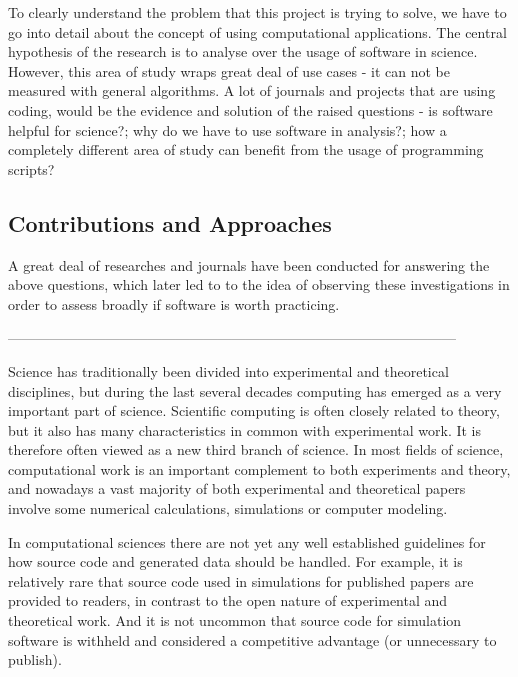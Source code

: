 
To clearly understand the problem that this project is trying to solve, we have to go into detail about the concept of using computational applications. The central hypothesis of the research is to analyse over the usage of software in science. However, this area of study wraps great deal of use cases - it can not be measured with general algorithms. A lot of journals and projects that are using coding, would be the evidence and solution of the raised questions - is software helpful for science?; why do we have to use software in analysis?; how a completely different area of study can benefit from the usage of programming scripts? 

\subsection*{Contributions and Approaches}
\label{sec:contributions}

A great deal of researches and journals have been conducted for answering the above questions, which later led to to the idea of observing these investigations in order to assess broadly if software is worth practicing. 

------------------------------------------------------------------------------------------------

Science has traditionally been divided into experimental and theoretical disciplines, but during the last
several decades computing has emerged as a very important part of science. Scientific computing is often
closely related to theory, but it also has many characteristics in common with experimental work. It is
therefore often viewed as a new third branch of science. In most fields of science, computational work is an
important complement to both experiments and theory, and nowadays a vast majority of both experimental
and theoretical papers involve some numerical calculations, simulations or computer modeling.

In computational sciences there are not yet any well established guidelines for how source code and
generated data should be handled. For example, it is relatively rare that source code used in simulations for
published papers are provided to readers, in contrast to the open nature of experimental and theoretical work.
And it is not uncommon that source code for simulation software is withheld and considered a competitive
advantage (or unnecessary to publish).\cite{johansson2014introduction}

